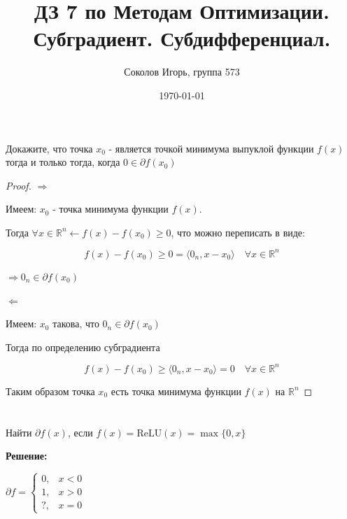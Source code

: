 \documentclass[a4paper,12pt]{article}
\author{Соколов Игорь, группа 573}
\title{ДЗ 7 по Методам Оптимизации. \newline Субградиент. Субдифференциал.}
\date{\today}
\newcommand{\p}{\partial}
\newcommand{\bb}{\mathbb}
\begin{document}

\maketitle

\section{}

Докажите, что точка $x_0$ - является точкой минимума выпуклой функции $f(x)$ тогда и только тогда, когда $0 \in \partial f(x_0)$

\begin{proof}

$\Longrightarrow$

Имеем:  $x_0$ - точка минимума функции $f(x)$.

Тогда $\forall x \in \bb R^n \leftarrow f(x) - f(x_0) \ge 0$, что можно переписать в виде:

$$f(x) - f(x_0) \ge 0 = \langle 0_n, x - x_0 \rangle \quad  \forall x \in \bb R^n$$

$\Rightarrow 0_n \in \p f(x_0)$

\vspace{\baselineskip}

$\Longleftarrow$

Имеем: $x_0\text{ такова, что } 0_n \in \p f(x_0) $

Тогда по определению субградиента 

$$f(x) - f(x_0) \ge \langle 0_n, x - x_0 \rangle = 0 \quad  \forall x \in \bb R^n$$

Таким образом точка $x_0$ есть точка минимума функции $f(x)$ на $\bb R^n$
\end{proof}

\section{}

Найти $\partial f(x)$, если $f(x) = \text{ReLU}(x) = \max \{0, x\}$

\vspace{\baselineskip}

\textbf{Решение:}

\vspace{\baselineskip}

$\p f = 
\begin{cases}
0,& x < 0\\
1,& x > 0\\
?,& x = 0
\end{cases}
$
\end{document}
